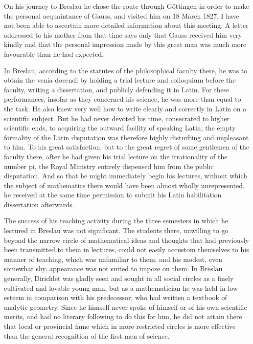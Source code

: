\documentclass[11pt]{article}
\begin{document}
On his journey to Breslau he chose the route through Göttingen in order to make the personal acquaintance of Gauss, and visited him on 18 March 1827. I have not been able to ascertain more detailed information about this meeting. A letter addressed to his mother from that time says only that Gauss received him very kindly and that the personal impression made by this great man was much more favourable than he had expected.

In Breslau, according to the statutes of the philosophical faculty there, he was to obtain the venia docendi by holding a trial lecture and colloquium before the faculty, writing a dissertation, and publicly defending it in Latin. For these performances, insofar as they concerned his science, he was more than equal to the task. He also knew very well how to write clearly and correctly in Latin on a scientific subject. But he had never devoted his time, consecrated to higher scientific ends, to acquiring the outward facility of speaking Latin; the empty formality of the Latin disputation was therefore highly disturbing and unpleasant to him. To his great satisfaction, but to the great regret of some gentlemen of the faculty there, after he had given his trial lecture on the irrationality of the number pi, the Royal Ministry entirely dispensed him from the public disputation. And so that he might immediately begin his lectures, without which the subject of mathematics there would have been almost wholly unrepresented, he received at the same time permission to submit his Latin habilitation dissertation afterwards.

The success of his teaching activity during the three semesters in which he lectured in Breslau was not significant. The students there, unwilling to go beyond the narrow circle of mathematical ideas and thoughts that had previously been transmitted to them in lectures, could not easily accustom themselves to his manner of teaching, which was unfamiliar to them; and his modest, even somewhat shy, appearance was not suited to impose on them. In Breslau generally, Dirichlet was gladly seen and sought in all social circles as a finely cultivated and lovable young man, but as a mathematician he was held in low esteem in comparison with his predecessor, who had written a textbook of analytic geometry. Since he himself never spoke of himself or of his own scientific merits, and had no literary following to do this for him, he did not attain there that local or provincial fame which in more restricted circles is more effective than the general recognition of the first men of science.
\end{document}
